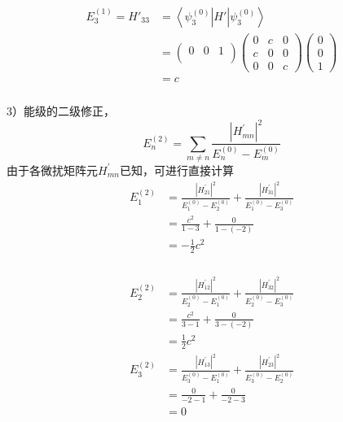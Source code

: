 \begin{frame}
  \frametitle{}
  \[ 
    \begin{aligned}
      E^{(1)}_3 = H'_{33} &= \left\langle \psi^{(0)}_3 \right\vert H' \left\vert \psi^{(0)}_3 \right\rangle \\ 
      &= \begin{pmatrix}
        0 & 0 & 1  \\ 
      \end{pmatrix} 
      \begin{pmatrix}
        0 & c & 0  \\
        c & 0 & 0  \\
        0 & 0 & c  
      \end{pmatrix} 
      \begin{pmatrix}
        0  \\
        0  \\
        1  
      \end{pmatrix} \\
      &=c 
    \end{aligned}  
    \]
\end{frame} 

\begin{frame}
  \frametitle{}
  3）能级的二级修正，
  \[ E^{(2)}_n = \sum_{m\ne n}  \frac{|H ^{\prime} _{mn}|^2}{E_n^{(0)}-E_m^{(0)}} \]
  由于各微扰矩阵元$H ^{\prime} _{mn}$已知，可进行直接计算
  \[ \begin{aligned}
    E^{(2)}_1 &= \frac{|H ^{\prime} _{21}|^2}{E_1^{(0)}-E_2^{(0)}} + \frac{|H ^{\prime} _{31}|^2}{E_1^{(0)}-E_3^{(0)}} \\ 
    &= \frac{c^2}{1-3} + \frac{0}{1-(-2)} \\
    &= - \frac{1}{2}c^2
  \end{aligned}  \]
\end{frame} 

\begin{frame}
  \frametitle{}
  \[ \begin{aligned}
    E^{(2)}_2 &= \frac{|H ^{\prime} _{12}|^2}{E_2^{(0)}-E_1^{(0)}} + \frac{|H ^{\prime} _{32}|^2}{E_2^{(0)}-E_3^{(0)}} \\ 
    &= \frac{c^2}{3-1} + \frac{0}{3-(-2)} \\
    &= \frac{1}{2}c^2
  \end{aligned}  \]
  \[ \begin{aligned}
    E^{(2)}_3 &= \frac{|H ^{\prime} _{13}|^2}{E_3^{(0)}-E_1^{(0)}} + \frac{|H ^{\prime} _{23}|^2}{E_3^{(0)}-E_2^{(0)}} \\ 
    &= \frac{0}{-2-1} + \frac{0}{-2-3} \\
    &= 0
  \end{aligned}  \]
\end{frame} 

